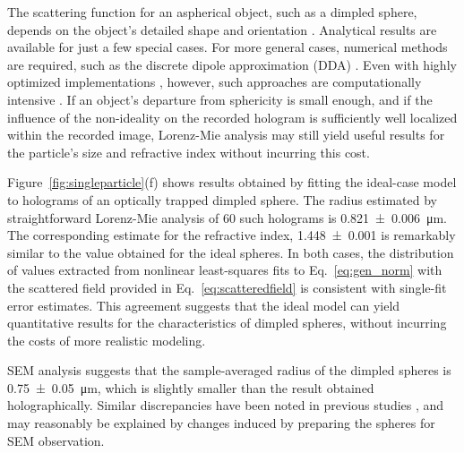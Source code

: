 The scattering function for an aspherical object, 
such as a dimpled sphere, depends on the object's detailed shape
and orientation \cite{mishchenko02}.
Analytical results are available for just a few special cases.
For more general cases, numerical methods are required, 
such as the discrete dipole approximation (DDA) \cite{draine94}. 
Even with highly optimized implementations \cite{yurkin11}, however,
such approaches are computationally intensive \cite{fung12,perry12,wang14using}.
If an object's departure from sphericity is small enough, and if the
influence of the non-ideality on the recorded hologram is sufficiently well
localized within the recorded image, Lorenz-Mie analysis
may still yield useful results for the particle's
size and refractive index without incurring this cost.

Figure~\ref{fig:singleparticle}(f) shows results obtained by fitting the
ideal-case model to holograms of an optically trapped dimpled sphere.
The radius estimated by straightforward 
Lorenz-Mie analysis of \num{60} such holograms
is \SI{0.821(6)}{\um}.
The corresponding estimate for the refractive index,
\num{1.448(1)} is remarkably similar to the value obtained for the
ideal spheres.
In both cases, the distribution of
values extracted from nonlinear least-squares 
fits to Eq.~\eqref{eq:gen_norm} with the scattered field provided
in Eq.~\eqref{eq:scatteredfield} is consistent with single-fit error estimates.
This agreement suggests that the ideal model can yield quantitative
results for the characteristics of dimpled spheres, without incurring
the costs of more realistic modeling.

SEM analysis suggests that the sample-averaged radius of the
dimpled spheres is \SI{0.75(5)}{\um}, which is slightly smaller
than the result obtained holographically.
Similar discrepancies have been noted in previous studies
\cite{yamada85,cermola87},
and may reasonably be explained by changes
induced by preparing the spheres for SEM observation.

